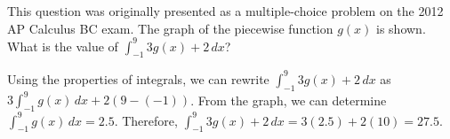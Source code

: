 \begin{Exercise}[label=defint4]
	This question was originally presented as a multiple-choice problem 
	on the 2012 AP Calculus BC exam. The graph of the piecewise function 
	$g(x)$ is shown. What is the value of $\int_{-1}^{9} 3 g(x) + 2\,dx$?
	
\end{Exercise}

\begin{Answer}[ref=defint4]
Using the properties of integrals, we can rewrite $\int_{-1}^{9} 3 
g(x) + 2\,dx$ as $3 \int_{-1}^{9} g(x)\,dx + 2 (9-(-1))$. From the 
graph, we can determine $\int_{-1}^{9} g(x)\,dx = 2.5$. Therefore, 
$\int_{-1}^{9} 3 g(x) + 2\,dx = 3 (2.5) + 2 (10) = 27.5$. 
\end{Answer}

